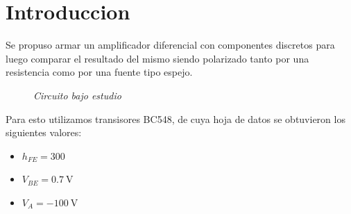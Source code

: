 \documentclass[a4paper,12pt]{article}
\newcommand{\mV}[1]{\SI{#1}{\volt}}
\begin{document}


\section{Introduccion}
    Se propuso armar un amplificador diferencial con componentes discretos para luego comparar el resultado del mismo siendo
    polarizado tanto por una resistencia como por una fuente tipo espejo.
    \begin{figure}[H]
        \setlength{\abovecaptionskip}{0pt}
		\centering
		\captionsetup{labelformat=empty}
		\caption{\small{\textit{ Circuito bajo estudio }}}
    \end{figure}
    Para esto utilizamos transisores BC548, de cuya hoja de datos se obtuvieron los siguientes valores:
    \begin{itemize}
        \item $h_{FE} = 300$
        \item $V_{BE} = \mV{0.7}$
        \item $V_A = \mV{-100}$
    \end{itemize}

\newpage
\end{document}
